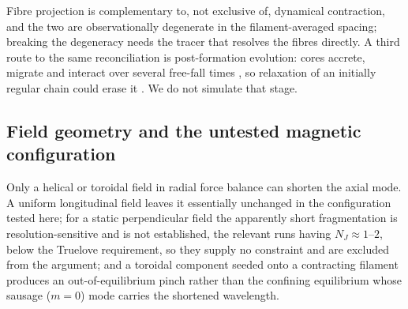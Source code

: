 \documentclass[usenatbib,twoside,twocolumn]{mnras}
\begin{document}
Fibre projection is complementary to, not exclusive of, dynamical contraction, and the two are observationally degenerate in the filament-averaged spacing; breaking the degeneracy needs the tracer that resolves the fibres directly. A third route to the same reconciliation is post-formation evolution: cores accrete, migrate and interact over several free-fall times \citep{Kirk2016,Mattern2018}, so relaxation of an initially regular chain could erase it \citep{Clarke2020}. We do not simulate that stage.

\subsection{Field geometry and the untested magnetic configuration}
\label{sec:optional_tests}

Only a helical or toroidal field in radial force balance can shorten the axial mode. A uniform longitudinal field leaves it essentially unchanged in the configuration tested here; for a static perpendicular field the apparently short fragmentation is resolution-sensitive and is not established, the relevant runs having $N_J\approx1$--$2$, below the Truelove requirement, so they supply no constraint and are excluded from the argument; and a toroidal component seeded onto a contracting filament produces an out-of-equilibrium pinch rather than the confining equilibrium whose sausage ($m=0$) mode carries the shortened wavelength.
\end{document}
